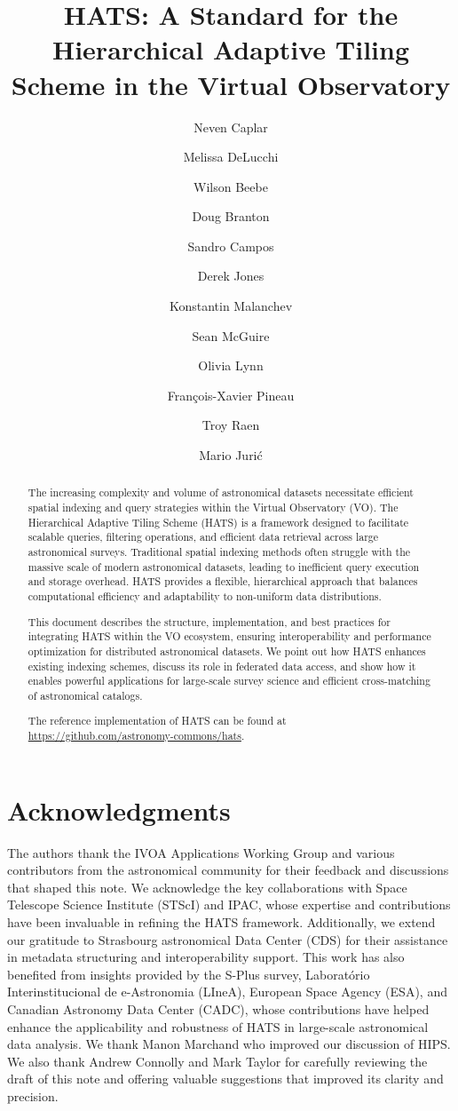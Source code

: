 \documentclass[11pt,a4paper]{ivoa}
\title{HATS: A Standard for the Hierarchical Adaptive Tiling Scheme in the Virtual Observatory}
\author[https://www.ivoa.net/authors/caplar]{Neven Caplar}
\author[https://www.ivoa.net/authors/delucchi]{Melissa DeLucchi}
\author[https://www.ivoa.net/authors/beebe]{Wilson Beebe}
\author[https://www.ivoa.net/authors/branton]{Doug Branton}
\author[https://www.ivoa.net/authors/campos]{Sandro Campos}
\author[https://www.ivoa.net/authors/jones]{Derek Jones}
\author[https://www.ivoa.net/authors/malanchev]{Konstantin Malanchev}
\author[https://www.ivoa.net/authors/mcguire]{Sean McGuire}
\author[https://www.ivoa.net/authors/lynn]{Olivia Lynn}
\author[https://www.ivoa.net/authors/pineau]{François-Xavier Pineau}
\author[https://www.ivoa.net/authors/raen]{Troy Raen}
\author[https://www.ivoa.net/authors/juric]{Mario Juri\'{c}}
\begin{document}
\begin{abstract}
The increasing complexity and volume of astronomical datasets necessitate efficient spatial indexing and query strategies within the Virtual Observatory (VO). 
The Hierarchical Adaptive Tiling Scheme (HATS) is a framework designed to facilitate scalable queries, filtering operations, and efficient data retrieval across large astronomical surveys. 
Traditional spatial indexing methods often struggle with the massive scale of modern astronomical datasets, leading to inefficient query execution and storage overhead. 
HATS provides a flexible, hierarchical approach that balances computational efficiency and adaptability to non-uniform data distributions.\par

This document describes the structure, implementation, and best practices for integrating HATS within the VO ecosystem, ensuring interoperability and performance optimization for distributed astronomical datasets. We point out how HATS enhances existing indexing schemes, discuss its role in federated data access, and show how it enables powerful applications for large-scale survey science and efficient cross-matching of astronomical catalogs. \par 
The reference implementation of HATS can be found at \url{https://github.com/astronomy-commons/hats}. 

\end{abstract}

\section*{Acknowledgments}
The authors thank the IVOA Applications Working Group and various contributors from the astronomical community for their feedback and discussions that shaped this note. 
We acknowledge the key collaborations with Space Telescope Science Institute (STScI) and IPAC, whose expertise and contributions have been invaluable in refining the HATS framework. 
Additionally, we extend our gratitude to  Strasbourg astronomical Data Center (CDS) for their assistance in metadata structuring and interoperability support. 
This work has also benefited from insights provided by the S-Plus survey, Laboratório Interinstitucional de e-Astronomia (LIneA), European Space Agency (ESA), and Canadian Astronomy Data Center (CADC), whose contributions have helped enhance the applicability and robustness of HATS in large-scale astronomical data analysis. 
We thank Manon Marchand who improved our discussion of HIPS. We also thank Andrew Connolly and Mark Taylor for carefully reviewing the draft of this note and offering valuable suggestions that improved its clarity and precision.  \par
\end{document}
